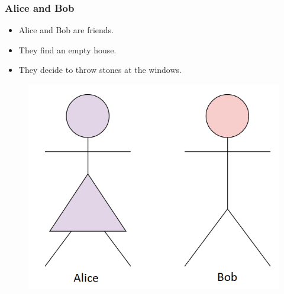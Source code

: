 \documentclass{beamer}
\theoremstyle{plain}
\theoremstyle{definition}
\begin{document}
\begin{frame}
\frametitle{Alice and Bob}
\begin{itemize}
\item Alice and Bob are friends.
\item They find an empty house.
\item They decide to throw stones at the windows.
\end{itemize}

\begin{figure}
\includegraphics[scale=0.4]{aliceandbob}
\end{figure}

\end{frame}
\end{document}
